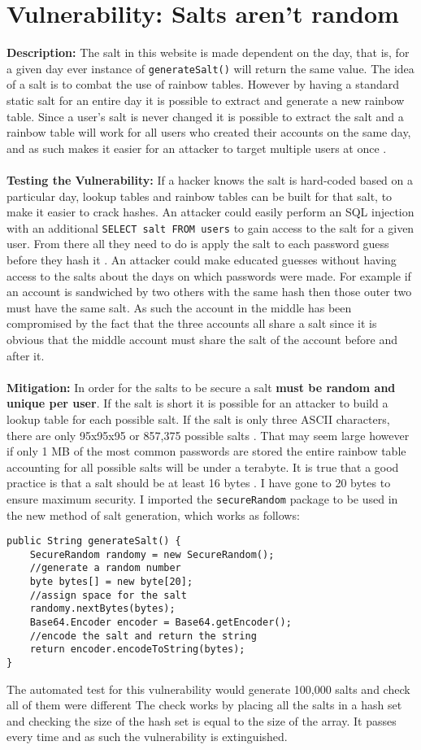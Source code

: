 \section{Vulnerability: Salts aren't random}
\label{sec:background}
\textbf{Description:} The salt in this website is made dependent on the day, that is, for a given day ever instance of \verb|generateSalt()| will return the same value. The idea of a salt
is to combat the use of rainbow tables. However by having a standard static salt for an entire day it is possible to extract and generate a new rainbow table. Since a user's salt is
never changed it is possible to extract the salt and a rainbow table will work for all users who created their accounts on the same day, and as such makes it easier for an attacker
to target multiple users at once \cite{salts1}. \\ \\
\textbf{Testing the Vulnerability:} If a hacker knows the salt is hard-coded based on a particular day, lookup tables and rainbow tables can be built for that salt, to make it
easier to crack hashes. An attacker could easily perform an SQL injection with an additional \verb|SELECT salt FROM users| to gain access to the salt for a given user. From there
all they need to do is apply the salt to each password guess before they hash it \cite{salts2}. An attacker could make educated guesses without having access to the salts about the days on which passwords were
made. For example if an account is sandwiched by two others with the same hash then those outer two must have the same salt. As such the account in the
middle has been compromised by the fact that the three accounts all share a salt since it is obvious that the middle account must share the salt of the account before and after
it.\\ \\
\textbf{Mitigation:} In order for the salts to be secure a salt \textbf{must be random and unique per user}. If the salt is short it is possible for an attacker to build a
lookup table for each possible salt. If the salt is only three ASCII characters, there are only 95x95x95 or 857,375 possible salts \cite{salts1}. That may seem large however if
only 1 MB of the most common passwords are stored the entire rainbow table accounting for all possible salts will be under a terabyte. It is true that a good practice is that a
salt should be at least 16 bytes \cite{6516321}. I have gone to 20 bytes to
ensure maximum security. I imported the \verb|secureRandom| package to be used in the new method of salt generation, which works as follows:
\begin{verbatim}
public String generateSalt() {
    SecureRandom randomy = new SecureRandom();
    //generate a random number
    byte bytes[] = new byte[20];
    //assign space for the salt
    randomy.nextBytes(bytes);
    Base64.Encoder encoder = Base64.getEncoder();
    //encode the salt and return the string
    return encoder.encodeToString(bytes);
}
\end{verbatim}
The automated test for this vulnerability would generate 100,000 salts and check all of them were different The check works by placing all the salts in a hash set and checking the
size of the hash set is equal to the size of the array. It passes every time and as such the vulnerability is extinguished.
